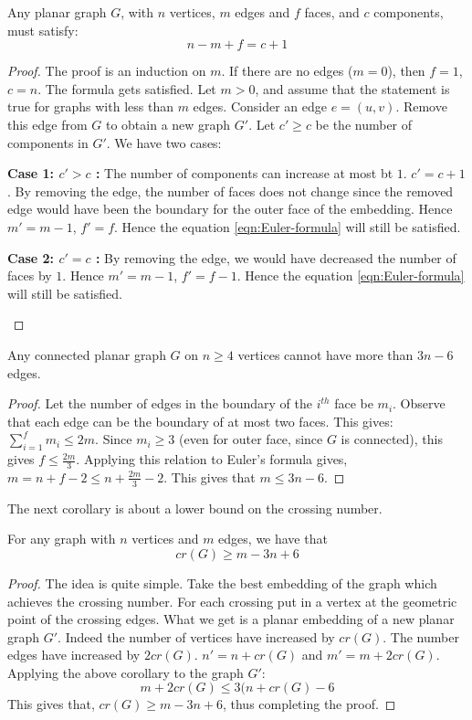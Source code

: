 \begin{proposition}
Any planar graph $G$, with $n$ vertices, $m$ edges and $f$ faces, and $c$ components, must satisfy:
\begin{equation}
n-m+f = c+1
\label{eqn:Euler-formula}
\end{equation}
\end{proposition}
\begin{proof}
The proof is an induction on $m$. If there are no edges ($m=0$), then $f=1$, $c=n$. The formula gets satisfied. Let $m > 0$, and assume that the statement is true for graphs with less than $m$ edges. Consider an edge $e=(u,v)$. Remove this edge from $G$ to obtain a new graph $G'$. Let $c' \ge c$ be the number of components in $G'$. We have two cases:
\begin{description}
\item{\bf Case 1: $c'>c$ : }
The number of components can increase at most bt $1$. $c'=c+1$. By removing the edge, the number of faces does not change since the removed edge would have been the boundary for the outer face of the embedding. Hence $m' = m-1$, $f' = f$. Hence the equation \ref{eqn:Euler-formula} will still be satisfied.
\item{\bf Case 2: $c'=c$ : }
By removing the edge, we would have decreased the number of faces by $1$. Hence $m' = m-1$, $f' = f-1$. Hence the equation \ref{eqn:Euler-formula} will still be satisfied.
\end{description}
\end{proof}

\begin{corollary}
Any connected planar graph $G$ on $n\ge 4$ vertices cannot have more than $3n-6$ edges.
\end{corollary}
\begin{proof}
Let the number of edges in the boundary of the $i^{th}$ face be $m_i$. Observe that each edge can be the boundary of at most two faces. This gives:
$\sum_{i=1}^f m_i \le 2m$. Since $m_i \ge 3$ (even for outer face, since $G$ is connected), this gives $f \le \frac{2m}{3}$. Applying this relation to Euler's formula gives, $m = n+f-2 \le n+\frac{2m}{3}-2$. This gives that $m \le 3n-6$.
\end{proof}
The next corollary is about a lower bound on the crossing number.
\begin{corollary}
\label{cor:euler-crlb}
For any graph with $n$ vertices and $m$ edges, we have that $$cr(G) \ge m-3n+6$$
\end{corollary}
\begin{proof}
The idea is quite simple. Take the best embedding of the graph which achieves the crossing number. For each crossing put in a vertex at the geometric point of the crossing edges. What we get is a planar embedding of a new planar graph $G'$. Indeed the number of vertices have increased by $cr(G)$. The number edges have increased by $2cr(G)$. $n' = n+cr(G)$ and $m' = m+2cr(G)$. Applying the above corollary to the graph $G'$:
$$m+2cr(G) \le 3(n+cr(G)-6$$
This gives that, $cr(G) \ge m-3n+6$, thus completing the proof.
\end{proof}

